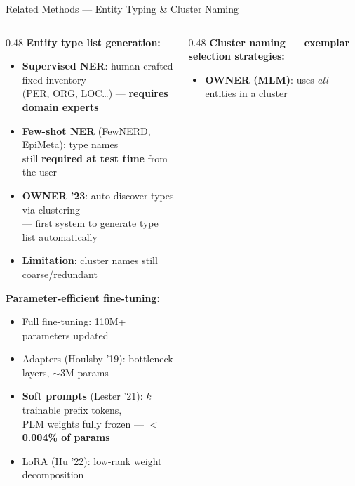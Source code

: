 \documentclass[aspectratio=169,10pt]{beamer}
\newcommand{\hg}[1]{\textcolor{dkgreen}{\textbf{#1}}}
\newcommand{\hr}[1]{\textcolor{dkred}{\textbf{#1}}}
\begin{document}
\begin{frame}{Related Methods — Entity Typing \& Cluster Naming}
  \begin{columns}[T]
    \begin{column}{0.48\textwidth}
      \textbf{Entity type list generation:}
      \begin{itemize}\setlength{\itemsep}{2pt}
        \item \textbf{Supervised NER}: human-crafted fixed inventory\\
              (PER, ORG, LOC…) — \hr{requires domain experts}
        \item \textbf{Few-shot NER} (FewNERD, EpiMeta): type names\\
              still \hr{required at test time} from the user
        \item \hg{\textbf{OWNER '23}}: auto-discover types via clustering\\
              — first system to generate type list automatically
        \item \hr{Limitation}: cluster names still coarse/redundant
      \end{itemize}
      \vspace{0.4em}
      \textbf{Parameter-efficient fine-tuning:}
      \begin{itemize}\setlength{\itemsep}{2pt}
        \item Full fine-tuning: 110M+ parameters updated
        \item Adapters (Houlsby '19): bottleneck layers, $\sim$3M params
        \item \textbf{Soft prompts} (Lester '21): $k$ trainable prefix tokens,\\
              PLM weights fully frozen — \hg{$<$0.004\% of params}
        \item LoRA (Hu '22): low-rank weight decomposition
      \end{itemize}
    \end{column}
    \begin{column}{0.48\textwidth}
      \textbf{Cluster naming — exemplar selection strategies:}
      \begin{itemize}\setlength{\itemsep}{2pt}
        \item \textbf{OWNER (MLM)}: uses \emph{all} entities in a cluster\\

\end{itemize}
\end{column}
\end{columns}
\end{frame}
\end{document}
